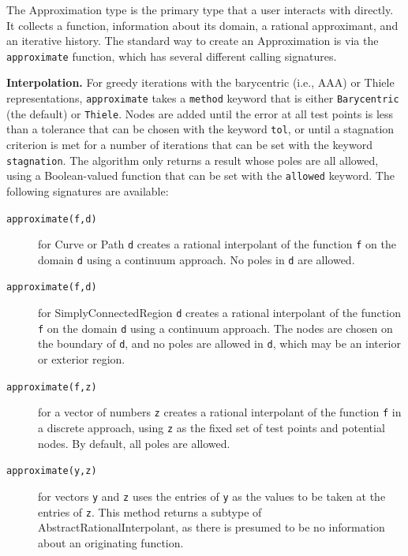 \documentclass{juliacon}
\begin{document}
The \textsf{Approximation} type is the primary type that a user interacts with directly. It collects a function, information about its domain, a rational approximant, and an iterative history. The standard way to create an \textsf{Approximation} is via the \verb|approximate| function, which has several different calling signatures. 

\textbf{Interpolation.} For greedy iterations with the barycentric (i.e., AAA) or Thiele representations, \texttt{approximate} takes a \texttt{method} keyword that is either \texttt{Barycentric} (the default) or \texttt{Thiele}. Nodes are added until the error at all test points is less than a tolerance that can be chosen with the keyword \texttt{tol}, or until a stagnation criterion is met for a number of iterations that can be set with the keyword \texttt{stagnation}. The algorithm only returns a result whose poles are all allowed, using a Boolean-valued function that can be set with the \texttt{allowed} keyword. The following signatures are available:
\begin{description}
    \item[\texttt{approximate(f,d)}] for \textsf{Curve} or \textsf{Path} \verb|d| creates a rational interpolant of the function \verb|f| on the domain \verb|d| using a continuum approach. No poles in \verb|d| are allowed.
    \item[\texttt{approximate(f,d)}] for \textsf{SimplyConnectedRegion} \verb|d| creates a rational interpolant of the function \verb|f| on the domain \verb|d| using a continuum approach. The nodes are chosen on the boundary of \verb|d|, and no poles are allowed in \verb|d|, which may be an interior or exterior region.
    \item[\texttt{approximate(f,z)}] for a vector of numbers \verb|z| creates a rational interpolant of the function \verb|f| in a discrete approach, using \verb|z| as the fixed set of test points and potential nodes. By default, all poles are allowed.
    \item[\texttt{approximate(y,z)}] for vectors \verb|y| and \verb|z| uses the entries of \verb|y| as the values to be taken at the entries of \verb|z|. This method returns a subtype of \textsf{AbstractRationalInterpolant}, as there is presumed to be no information about an originating function.
\end{description}
\end{document}
